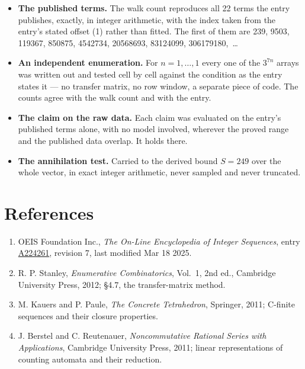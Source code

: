 \documentclass[11pt]{article}
\theoremstyle{definition}
\begin{document}
\begin{itemize}

\item {\bfseries The published terms.} The walk count reproduces all 22 terms the entry publishes, exactly, in integer arithmetic, with the index taken from the entry's stated offset (1) rather than fitted. The first of them are 239, 9503, 119367, 850875, 4542734, 20568693, 83124099, 306179180,~\dots

\item {\bfseries An independent enumeration.} For $n = 1,\dots,1$ every one of the $3^{7n}$ arrays was written out and tested cell by cell against the condition as the entry states it --- no transfer matrix, no row window, a separate piece of code. The counts agree with the walk count and with the entry.

\item {\bfseries The claim on the raw data.} Each claim was evaluated on the entry's published terms alone, with no model involved, wherever the proved range and the published data overlap. It holds there.

\item {\bfseries The annihilation test.} Carried to the derived bound $S = 249$ over the whole vector, in exact integer arithmetic, never sampled and never truncated.

\end{itemize}

\section{References}

\begin{enumerate}

\item OEIS Foundation Inc., \emph{The On-Line Encyclopedia of Integer Sequences}, entry \href{https://oeis.org/A224261}{A224261}, revision 7, last modified Mar 18 2025.

\item R. P. Stanley, \emph{Enumerative Combinatorics}, Vol.~1, 2nd ed., Cambridge University Press, 2012; \S4.7, the transfer-matrix method.

\item M. Kauers and P. Paule, \emph{The Concrete Tetrahedron}, Springer, 2011; C-finite sequences and their closure properties.

\item J. Berstel and C. Reutenauer, \emph{Noncommutative Rational Series with Applications}, Cambridge University Press, 2011; linear representations of counting automata and their reduction.

\end{enumerate}
\end{document}
